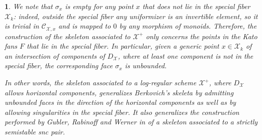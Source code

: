 \documentclass{amsart}%
\numberwithin{equation}{subsection}
\theoremstyle{plain2}
\theoremstyle{definition2}
\theoremstyle{stepstyle}
\theoremstyle{point}
\theoremstyle{subpoint}
\newtheorem{subpoint}[equation]{}%
\newcommand{\spa}[1]{\begin{subpoint}#1\end{subpoint}}           %
\newcommand{\cX}{\ensuremath{\mathscr{X}}}
\newcommand{\caC}{\ensuremath{\mathcal{C}}}
\begin{document}
\spa{ \label{rem points in kato fan and skeleton}
We note that $\sigma_x$ is empty for any point $x$ that does not lie in the special fiber $\cX_k$: indeed, outside the special fiber any uniformizer is an invertible element, so it is trivial in $\caC_{\cX,x}$ and is mapped to $0$ by any morphism of monoids. Therefore, the construction of the skeleton associated to $\cX^+$ only concerns the points in the Kato fans $F$ that lie in the special fiber. In particular, given a generic point $x \in \cX_k$ of an intersection of components of $D_\cX$, where at least one component is not in the special fiber, the corresponding face $\sigma_x$ is unbounded.

In other words, the skeleton associated to a log-regular scheme $\cX^+$, where $D_\cX$ allows horizontal components, generalizes Berkovich's skeleta by admitting unbounded faces in the direction of the horizontal components as well as by allowing singularities in the special fiber. It also generalizes the construction performed by Gubler, Rabinoff and Werner in \cite{GublerRabinoffWerner} of a skeleton associated to a strictly semistable snc pair.
}
 
\end{document}
